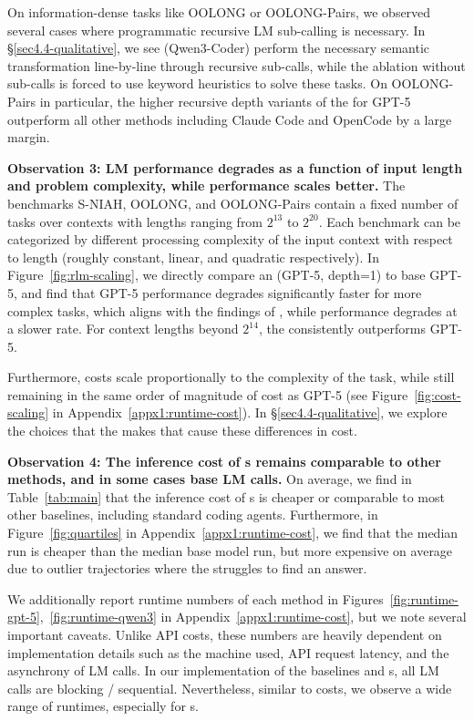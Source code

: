 On information-dense tasks like OOLONG or OOLONG-Pairs, we observed several cases where programmatic recursive LM sub-calling is necessary. In \S\ref{sec4.4-qualitative}, we see \RLM{}(Qwen3-Coder) perform the necessary semantic transformation line-by-line through recursive sub-calls, while the ablation without sub-calls is forced to use keyword heuristics to solve these tasks. On OOLONG-Pairs in particular, the higher recursive depth variants of the \RLM{} for GPT-5 outperform all other methods including Claude Code and OpenCode by a large margin. 






\textbf{Observation 3: LM performance degrades as a function of input length and problem complexity, while \RLM{} performance scales better.} The benchmarks {S-NIAH}, {OOLONG}, and {OOLONG-Pairs} contain a fixed number of tasks over contexts with lengths ranging from $2^{13}$ to $2^{20}$. Each benchmark can be categorized by different processing complexity of the input context with respect to length (roughly constant, linear, and quadratic respectively). In Figure~\ref{fig:rlm-scaling}, we directly compare an \RLM{}(GPT-5, depth=1) to base GPT-5, and find that GPT-5 performance degrades significantly faster for more complex tasks, which aligns with the findings of \citet{goldman2025reallylongcontextneed}, while \RLM{} performance degrades at a slower rate. For context lengths beyond $2^{14}$, the \RLM{} consistently outperforms GPT-5.

Furthermore, \RLM{} costs scale proportionally to the complexity of the task, while still remaining in the same order of magnitude of cost as GPT-5 (see Figure~\ref{fig:cost-scaling} in Appendix~\ref{appx1:runtime-cost}). In \S\ref{sec4.4-qualitative}, we explore the choices that the \RLM{} makes that cause these differences in cost. %

\textbf{Observation 4: The inference cost of \RLM{}s remains comparable to other methods, and in some cases base LM calls.} On average, we find in Table~\ref{tab:main} that the inference cost of \RLM{}s is cheaper or comparable to most other baselines, including standard coding agents. Furthermore, in Figure~\ref{fig:quartiles} in Appendix~\ref{appx1:runtime-cost}, we find that the median \RLM{} run is cheaper than the median base model run, but more expensive on average due to outlier trajectories where the \RLM{} struggles to find an answer.

We additionally report runtime numbers of each method in Figures~\ref{fig:runtime-gpt-5},~\ref{fig:runtime-qwen3} in Appendix~\ref{appx1:runtime-cost}, but we note several important caveats. Unlike API costs, these numbers are heavily dependent on implementation details such as the machine used, API request latency, and the asynchrony of LM calls. In our implementation of the baselines and \RLM{}s, all LM calls are blocking / sequential. Nevertheless, similar to costs, we observe a wide range of runtimes, especially for \RLM{}s.

